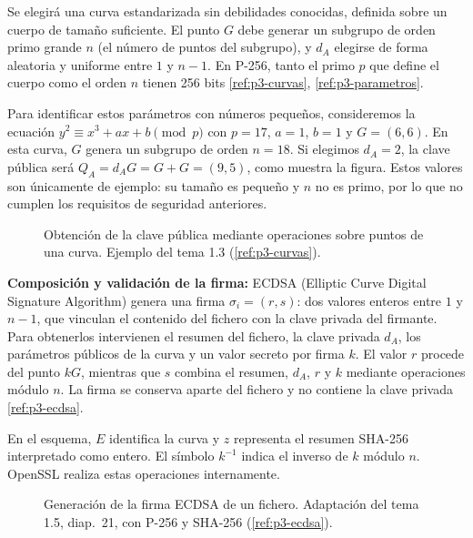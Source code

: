 Se elegirá una curva estandarizada sin debilidades conocidas, definida sobre un cuerpo de tamaño suficiente. El punto $G$ debe generar un subgrupo de orden primo grande $n$ (el número de puntos del subgrupo), y $d_A$ elegirse de forma aleatoria y uniforme entre $1$ y $n-1$. En P-256, tanto el primo $p$ que define el cuerpo como el orden $n$ tienen 256 bits \ref{ref:p3-curvas}, \ref{ref:p3-parametros}.

Para identificar estos parámetros con números pequeños, consideremos la ecuación $y^2\equiv x^3+ax+b\pmod p$ con $p=17$, $a=1$, $b=1$ y $G=(6,6)$. En esta curva, $G$ genera un subgrupo de orden $n=18$. Si elegimos $d_A=2$, la clave pública será $Q_A=d_AG=G+G=(9,5)$, como muestra la figura. Estos valores son únicamente de ejemplo: su tamaño es pequeño y $n$ no es primo, por lo que no cumplen los requisitos de seguridad anteriores. 

\begin{figure}[H]
  \centering
  \resizebox{\textwidth}{!}{}
  \caption{Obtención de la clave pública mediante operaciones sobre puntos de una curva. Ejemplo del tema 1.3 (\ref{ref:p3-curvas}).}
  \label{fig:p3-curva-eliptica}
\end{figure}

\textbf{Composición y validación de la firma:} ECDSA (Elliptic Curve Digital Signature Algorithm) genera una firma $\sigma_i=(r,s)$: dos valores enteros entre $1$ y $n-1$, que vinculan el contenido del fichero con la clave privada del firmante. Para obtenerlos intervienen el resumen del fichero, la clave privada $d_A$, los parámetros públicos de la curva y un valor secreto por firma $k$. El valor $r$ procede del punto $kG$, mientras que $s$ combina el resumen, $d_A$, $r$ y $k$ mediante operaciones módulo $n$. La firma se conserva aparte del fichero y no contiene la clave privada \ref{ref:p3-ecdsa}.

En el esquema, $E$ identifica la curva y $z$ representa el resumen SHA-256 interpretado como entero. El símbolo $k^{-1}$ indica el inverso de $k$ módulo $n$. OpenSSL realiza estas operaciones internamente.

\begin{figure}[H]
  \centering
  \resizebox{\textwidth}{!}{}
  \caption{Generación de la firma ECDSA de un fichero. Adaptación del tema 1.5, diap.~21, con P-256 y SHA-256 (\ref{ref:p3-ecdsa}).}
  \label{fig:p3-ecdsa-firma}
\end{figure}

